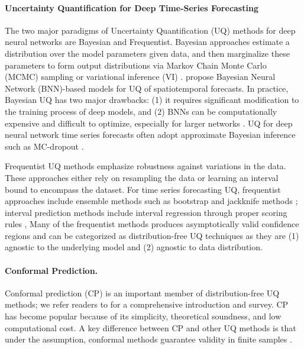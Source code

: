 
\paragraph{Uncertainty Quantification for Deep Time-Series Forecasting} The two major paradigms of  Uncertainty Quantification (UQ) methods for deep neural networks are Bayesian and Frequentist. Bayesian approaches estimate a distribution over the model parameters given data, and then marginalize these parameters to form output distributions via Markov Chain Monte Carlo (MCMC) sampling \cite{welling2011bayesian, neal2012bayesian, chen2014stochastic} or variational inference (VI)  \cite{graves2011practical,kingma2015variational, blundell2015weight, louizos2017multiplicative}. \cite{wang2019deep, wu2021quantifying} propose Bayesian Neural Network (BNN)-based models for UQ of spatiotemporal forecasts. In practice, Bayesian UQ has two major drawbacks: (1) it requires significant modification to the training process of deep models, and (2) BNNs can be computationally expensive and difficult to optimize, especially for larger networks \cite{lakshminarayanan2017simple, zadrozny2001obtaining}. UQ for deep neural network time series forecasts often adopt approximate Bayesian inference such as MC-dropout \cite{gal2016theoretically, gal2017concrete}.

Frequentist UQ methods emphasize robustness against variations in the data. These approaches either rely on resampling the data or learning an interval bound to encompass the dataset. For time series forecasting UQ, frequentist approaches include ensemble methods such as bootstrap \cite{efron2016, alaa2020frequentist} and jackknife methods  \cite{jackknife+after, bjrnn}; interval prediction methods include interval regression through proper scoring rules \cite{kivaranovic2020adaptive, wu2021quantifying},  Many of the frequentist methods produces asymptotically valid confidence regions and can be categorized as distribution-free UQ techniques as they are (1) agnostic to the underlying model and (2) agnostic to data distribution.

\paragraph{Conformal Prediction.} 
Conformal prediction (CP) is an important member of distribution-free UQ methods; we refer readers to \cite{angelopoulos2021gentle} for a comprehensive introduction and survey. CP has become popular because of its simplicity, theoretical soundness, and low computational cost. A key difference between CP and other UQ methods is that under the  assumption, conformal methods guarantee validity in finite samples \cite{vovk2005algorithmic}.

